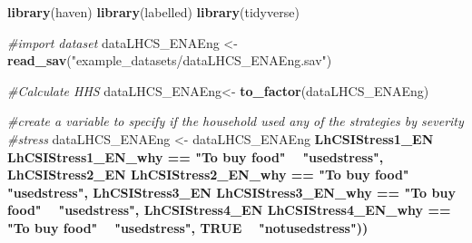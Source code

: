 \documentclass[
]{book}
\newenvironment{Shaded}{\begin{snugshade}}{\end{snugshade}}
\newcommand{\CommentTok}[1]{\textcolor[rgb]{0.56,0.35,0.01}{\textit{#1}}}
\newcommand{\DataTypeTok}[1]{\textcolor[rgb]{0.13,0.29,0.53}{#1}}
\newcommand{\KeywordTok}[1]{\textcolor[rgb]{0.13,0.29,0.53}{\textbf{#1}}}
\newcommand{\NormalTok}[1]{#1}
\newcommand{\OperatorTok}[1]{\textcolor[rgb]{0.81,0.36,0.00}{\textbf{#1}}}
\newcommand{\OtherTok}[1]{\textcolor[rgb]{0.56,0.35,0.01}{#1}}
\newcommand{\StringTok}[1]{\textcolor[rgb]{0.31,0.60,0.02}{#1}}
\begin{document}
\begin{Shaded}
\begin{Highlighting}[]
\KeywordTok{library}\NormalTok{(haven)}
\KeywordTok{library}\NormalTok{(labelled)}
\KeywordTok{library}\NormalTok{(tidyverse)}

\CommentTok{#import dataset}
\NormalTok{dataLHCS_ENAEng <-}\StringTok{ }\KeywordTok{read_sav}\NormalTok{(}\StringTok{"example_datasets/dataLHCS_ENAEng.sav"}\NormalTok{)}

\CommentTok{#Calculate HHS }
\NormalTok{dataLHCS_ENAEng<-}\StringTok{ }\KeywordTok{to_factor}\NormalTok{(dataLHCS_ENAEng)}

\CommentTok{#create a variable to specify if the household used any of the strategies by severity }
\CommentTok{#stress}
\NormalTok{dataLHCS_ENAEng <-}\StringTok{ }\NormalTok{dataLHCS_ENAEng }\OperatorTok{%>%}\StringTok{ }\KeywordTok{mutate}\NormalTok{(}\DataTypeTok{stress_coping =} \KeywordTok{case_when}\NormalTok{(}
\NormalTok{LhCSIStress1_EN }\OperatorTok{%in%}\StringTok{ }\KeywordTok{c}\NormalTok{(}\StringTok{"Yes"}\NormalTok{,}\StringTok{"No; because I already sold those assets or did this activity in the last 12 months and cannot continue to do it"}\NormalTok{) }\OperatorTok{&}\StringTok{ }
\NormalTok{LhCSIStress1_EN_why }\OperatorTok{==}\StringTok{ "To buy food"} \OperatorTok{~}\StringTok{ "usedstress"}\NormalTok{,}
\NormalTok{LhCSIStress2_EN }\OperatorTok{%in%}\StringTok{ }\KeywordTok{c}\NormalTok{(}\StringTok{"Yes"}\NormalTok{,}\StringTok{"No; because I already sold those assets or did this activity in the last 12 months and cannot continue to do it"}\NormalTok{) }\OperatorTok{&}
\NormalTok{LhCSIStress2_EN_why }\OperatorTok{==}\StringTok{ "To buy food"} \OperatorTok{~}\StringTok{ "usedstress"}\NormalTok{,}
\NormalTok{LhCSIStress3_EN }\OperatorTok{%in%}\StringTok{ }\KeywordTok{c}\NormalTok{(}\StringTok{"Yes"}\NormalTok{,}\StringTok{"No; because I already sold those assets or did this activity in the last 12 months and cannot continue to do it"}\NormalTok{) }\OperatorTok{&}
\NormalTok{LhCSIStress3_EN_why }\OperatorTok{==}\StringTok{ "To buy food"} \OperatorTok{~}\StringTok{ "usedstress"}\NormalTok{,}
\NormalTok{LhCSIStress4_EN }\OperatorTok{%in%}\StringTok{ }\KeywordTok{c}\NormalTok{(}\StringTok{"Yes"}\NormalTok{,}\StringTok{"No; because I already sold those assets or did this activity in the last 12 months and cannot continue to do it"}\NormalTok{) }\OperatorTok{&}
\NormalTok{LhCSIStress4_EN_why }\OperatorTok{==}\StringTok{ "To buy food"} \OperatorTok{~}\StringTok{ "usedstress"}\NormalTok{,}
\OtherTok{TRUE} \OperatorTok{~}\StringTok{ "notusedstress"}\NormalTok{))}
}}}}}
\end{Highlighting}
\end{Shaded}
\end{document}
